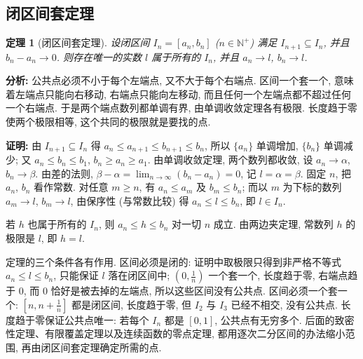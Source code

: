 \documentclass[UTF8,openany]{ctexbook}
\theoremstyle{chinesetextbook}
\newtheorem{theorem}{定理}[section]
\newenvironment{cnproof}{\par\indent\textbf{证明:} \ignorespaces}{\par}
\begin{document}
\subsection{闭区间套定理}
\begin{theorem}[闭区间套定理]
设闭区间 $I_n=[a_n,b_n]$ ($n\in\mathbb N^+$) 满足 $I_{n+1}\subseteq I_n$, 并且 $b_n-a_n\to0$. 则存在唯一的实数 $l$ 属于所有的 $I_n$, 并且 $a_n\to l$, $b_n\to l$.
\end{theorem}
\par\indent\textbf{分析:} 公共点必须不小于每个左端点, 又不大于每个右端点. 区间一个套一个, 意味着左端点只能向右移动, 右端点只能向左移动, 而且任何一个左端点都不超过任何一个右端点. 于是两个端点数列都单调有界, 由单调收敛定理各有极限. 长度趋于零使两个极限相等, 这个共同的极限就是要找的点.
\begin{cnproof}
由 $I_{n+1}\subseteq I_n$ 得 $a_n\le a_{n+1}\le b_{n+1}\le b_n$, 所以 $\{a_n\}$ 单调增加, $\{b_n\}$ 单调减少; 又 $a_n\le b_n\le b_1$, $b_n\ge a_n\ge a_1$. 由单调收敛定理, 两个数列都收敛, 设 $a_n\to\alpha$, $b_n\to\beta$. 由差的法则, $\displaystyle\beta-\alpha=\lim_{n\to\infty}(b_n-a_n)=0$, 记 $l=\alpha=\beta$. 固定 $n$, 把 $a_n$, $b_n$ 看作常数. 对任意 $m\ge n$, 有 $a_n\le a_m$ 及 $b_m\le b_n$; 而以 $m$ 为下标的数列 $a_m\to l$, $b_m\to l$, 由保序性 (与常数比较) 得 $a_n\le l\le b_n$, 即 $l\in I_n$.

若 $h$ 也属于所有的 $I_n$, 则 $a_n\le h\le b_n$ 对一切 $n$ 成立. 由两边夹定理, 常数列 $h$ 的极限是 $l$, 即 $h=l$.
\end{cnproof}
定理的三个条件各有作用. 区间必须是闭的: 证明中取极限只得到非严格不等式 $a_n\le l\le b_n$, 只能保证 $l$ 落在闭区间中; $\displaystyle\left(0,\frac1n\right)$ 一个套一个, 长度趋于零, 右端点趋于 $0$, 而 $0$ 恰好是被去掉的左端点, 所以这些区间没有公共点. 区间必须一个套一个: $\displaystyle\left[n,n+\frac1n\right]$ 都是闭区间, 长度趋于零, 但 $I_2$ 与 $I_3$ 已经不相交, 没有公共点. 长度趋于零保证公共点唯一: 若每个 $I_n$ 都是 $[0,1]$, 公共点有无穷多个. 后面的致密性定理、有限覆盖定理以及连续函数的零点定理, 都用逐次二分区间的办法缩小范围, 再由闭区间套定理确定所需的点.
\end{document}
